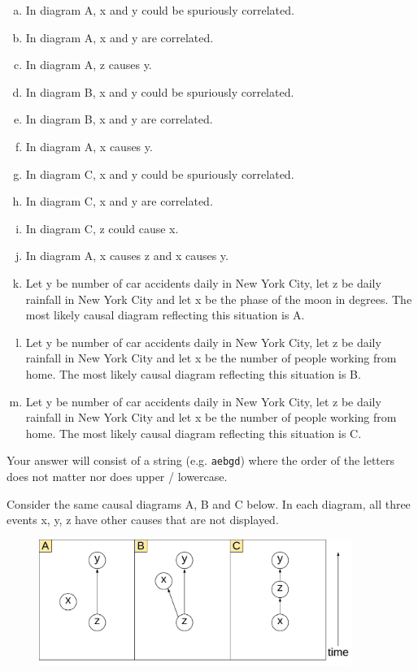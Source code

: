 \documentclass[12pt]{article}
\newcommand{\instr}{\small Your answer will consist of a string (e.g. \texttt{aebgd}) where the order of the letters does not matter nor does upper / lowercase. \normalsize}
\begin{document}
\begin{enumerate}[(a)]
\item In diagram A, x and y could be spuriously correlated.
\item In diagram A, x and y are correlated.
\item In diagram A, z causes y.
\item In diagram B, x and y could be spuriously correlated.
\item In diagram B, x and y are correlated.
\item In diagram A, x causes y.
\item In diagram C, x and y could be spuriously correlated.
\item In diagram C, x and y are correlated.
\item In diagram C, z could cause x.
\item In diagram A, x causes z and x causes y.
\item Let y be number of car accidents daily in New York City, let z be daily rainfall in New York City and let x be the phase of the moon in degrees. The most likely causal diagram reflecting this situation is A.
\item Let y be number of car accidents daily in New York City, let z be daily rainfall in New York City and let x be the number of people working from home. The most likely causal diagram reflecting this situation is B.
\item Let y be number of car accidents daily in New York City, let z be daily rainfall in New York City and let x be the number of people working from home. The most likely causal diagram reflecting this situation is C.
\end{enumerate}
\eenum\instr\pagebreak



\problem [11min] Consider the same causal diagrams A, B and C below. In each diagram, all three events x, y, z have other causes that are not displayed.


\begin{figure}[htp]
\centering
\includegraphics[width=4in]{basic_causal_diagrams}
\end{figure}
\end{document}
